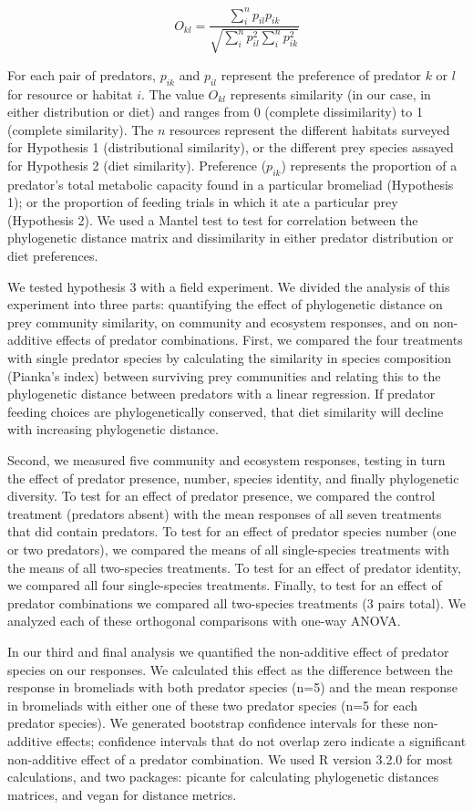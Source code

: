 \[O_{kl}=\dfrac{\sum_i^n{p_{il} p_{ik}}}{\sqrt{\sum_i^n{p_{il}^2} \sum_i^n{p_{ik}^2}}}\]

For each pair of predators, \(p_{ik}\) and \(p_{il}\) represent the
preference of predator \(k\) or \(l\) for resource or habitat \(i\). The
value \(O_{kl}\) represents similarity (in our case, in either
distribution or diet) and ranges from 0 (complete dissimilarity) to 1
(complete similarity). The \(n\) resources represent the different
habitats surveyed for Hypothesis 1 (distributional similarity), or the
different prey species assayed for Hypothesis 2 (diet similarity).
Preference (\(p_{ik}\)) represents the proportion of a predator's total
metabolic capacity found in a particular bromeliad (Hypothesis 1); or
the proportion of feeding trials in which it ate a particular prey
(Hypothesis 2). We used a Mantel test to test for correlation between the phylogenetic distance matrix
and dissimilarity in either predator distribution or diet preferences.

We tested hypothesis 3 with a field experiment. We divided the analysis of this experiment into three parts: quantifying
the effect of phylogenetic distance on prey community similarity, on
community and ecosystem responses, and on non-additive effects of
predator combinations. First, we compared the four treatments with
single predator species by calculating the similarity in species
composition (Pianka's index) between surviving prey communities and
relating this to the phylogenetic distance between predators with a
linear regression. If predator feeding choices are phylogenetically
conserved, that diet similarity will decline with increasing
phylogenetic distance.

Second, we measured five community and ecosystem responses, testing in
turn the effect of predator presence, number, species identity, and
finally phylogenetic diversity. To test for an effect of predator
presence, we compared the control treatment (predators absent) with the
mean responses of all seven treatments that did contain predators. To
test for an effect of predator species number (one or two predators), we
compared the means of all single-species treatments with the means of
all two-species treatments. To test for an effect of predator identity,
we compared all four single-species treatments. Finally, to test for an
effect of predator combinations we compared all two-species treatments
(3 pairs total). We analyzed each of these orthogonal
comparisons with one-way ANOVA.

In our third and final analysis we quantified the non-additive effect of
predator species on our responses. We calculated this effect as the
difference between the response in bromeliads with both predator species
(n=5) and the mean response in bromeliads with either one of these two
predator species (n=5 for each predator species). We generated bootstrap
confidence intervals for these non-additive effects; confidence
intervals that do not overlap zero indicate a significant non-additive
effect of a predator combination. We used R version 3.2.0 \citep{rcore}
for most calculations, and two packages: picante \citep{picante} for
calculating phylogenetic distances matrices, and vegan \citep{vegan} for
distance metrics.

